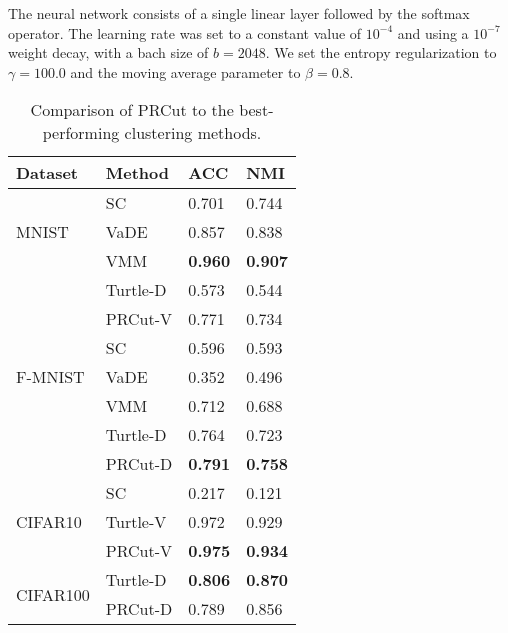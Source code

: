 The neural network consists of a single linear layer followed by the softmax operator. The learning rate was set to a constant value of $10^{-4}$ and using a $10^{-7}$ weight decay, with a bach size of $b=2048$. We set the entropy regularization to $\gamma=100.0$ and the moving average parameter to $\beta=0.8$.

\begin{table}[ht]
	\caption{Comparison of PRCut to the best-performing clustering methods.}
	\centering
	\begin{tabular}{l@{\hspace{5mm}}l@{\hspace{5mm}}ll}
		\toprule
		{Dataset}                 & {Method} & ACC            & NMI          \\
		\hline
		\multirow{3}{*}{MNIST}    & SC       & 0.701          & 0.744        \\
		                          & VaDE     & 0.857          & 0.838          \\
		                          & VMM      & \textbf{0.960} & \textbf{0.907} \\
		                          & Turtle-D & 0.573          & 0.544          \\
		                          & PRCut-V  & 0.771           & 0.734         \\
		\hline
		\multirow{3}{*}{F-MNIST}
		                          & SC       & 0.596          & 0.593          \\
		                          & VaDE     & 0.352          & 0.496          \\
		                          & VMM      & 0.712          & 0.688          \\
		                          & Turtle-D & 0.764          & 0.723          \\
		                          & PRCut-D  & \textbf{0.791} & \textbf{0.758} \\
		\hline

		\hline
		\multirow{3}{*}{CIFAR10}  & SC       & 0.217          & 0.121          \\
		                          & Turtle-V & 0.972          & 0.929          \\
		                          & PRCut-V  & \textbf{0.975} & \textbf{0.934} \\
		\hline
		\multirow{3}{*}{CIFAR100} & Turtle-D & \textbf{0.806} & \textbf{0.870} \\
		                          & PRCut-D  & 0.789          & 0.856          \\
		\hline
	\end{tabular}
	\label{table:exp3}
\end{table}

